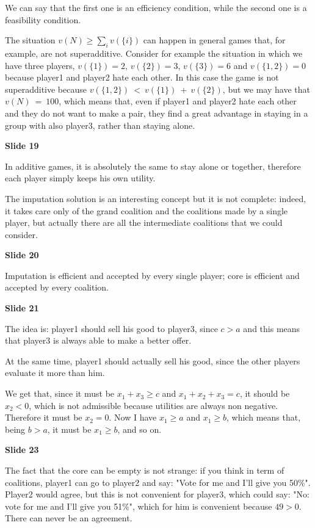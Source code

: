 \documentclass[pt11,a4paper,twoside,reqno,openright]{paper}
\begin{document}
\noindent We can say that the first one is an efficiency condition, while 
the second one is a feasibility condition.

\noindent The situation $v(N) \geq \sum_i{v(\{i\})}$ can happen in general 
games that, for example, are not superadditive. Consider for example the 
situation in which we have three players, $v(\{1\})=2$, $v(\{2\})=3$, 
$v(\{3\})=6$ and $v(\{1,2\})=0$ because player1 and player2 hate each 
other. In this case the game is not superadditive because 
$v(\{1,2\})~<~v(\{1\})~+~v(\{2\})$, but we may have that $v(N)~=~100$, 
which means that, even if player1 and player2 hate each other and they do 
not want to make a pair, they find a great advantage in staying in a group 
with also player3, rather than staying alone.

\bigskip
\noindent \textbf{Slide 19}

\noindent In additive games, it is absolutely the same to stay alone or 
together, therefore each player simply keeps his own utility.

\noindent The imputation solution is an interesting concept but it is not 
complete: indeed, it takes care only of the grand coalition and the coalitions 
made by a single player, but actually there are all the intermediate 
coalitions that we could consider.

\bigskip
\noindent \textbf{Slide 20} 

\noindent Imputation is efficient and accepted by every single player; core 
is efficient and accepted by every coalition.

\bigskip
\noindent \textbf {Slide 21}

\noindent The idea is: player1 should sell his good to player3, since $c>a$ 
and this means that player3 is always able to make a better offer.

\noindent At the same time, player1 should actually sell his good, since the 
other players evaluate it more than him.

\noindent We get that, since it must be $x_1+x_3\geq c$ and $x_1+x_2+x_3=c$, 
it should be $x_2<0$, which is not admissible because utilities are always 
non negative. Therefore it must be $x_2=0$. Now I have $x_1\geq a$ and 
$x_1 \geq b$, which means that, being $b>a$, it must be $x_1\geq b$, and 
so on.

\bigskip
\noindent \textbf{Slide 23}

\noindent The fact that the core can be empty is not strange: if you think 
in term of coalitions, player1 can go to player2 and say: "Vote for me and 
I'll give you 50\%". Player2 would agree, but this is not convenient for 
player3, which could say: "No: vote for me and I'll give you 51\%", which 
for him is convenient because $49>0$. There can never be an agreement.
\end{document}
